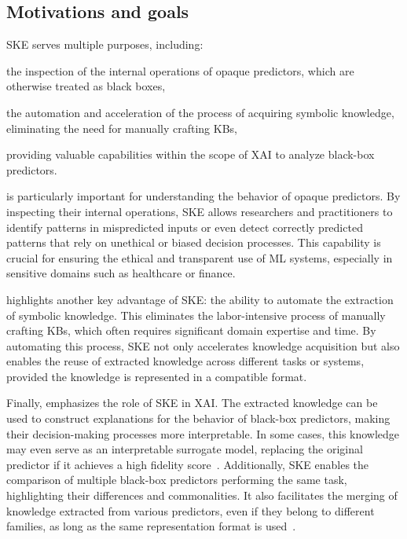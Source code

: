 \subsection{Motivations and goals}\label{subsec:ske-motivations-and-goals}
%
\Gls{SKE} serves multiple purposes, including:
%
\begin{inlinelist}
    \item \label{itm:inspection} the inspection of the internal operations of opaque predictors, which are otherwise treated as black boxes,
    \item \label{itm:automation} the automation and acceleration of the process of acquiring symbolic knowledge, eliminating the need for manually crafting \glspl{KB},
    \item \label{itm:xai} providing valuable capabilities within the scope of \gls{XAI} to analyze black-box predictors.
\end{inlinelist}

 is particularly important for understanding the behavior of opaque predictors.
%
By inspecting their internal operations, \gls{SKE} allows researchers and practitioners to identify patterns in mispredicted inputs or even detect correctly predicted patterns that rely on unethical or biased decision processes.
%
This capability is crucial for ensuring the ethical and transparent use of \gls{ML} systems, especially in sensitive domains such as healthcare or finance.

 highlights another key advantage of \gls{SKE}: the ability to automate the extraction of symbolic knowledge.
%
This eliminates the labor-intensive process of manually crafting \glspl{KB}, which often requires significant domain expertise and time.
%
By automating this process, \gls{SKE} not only accelerates knowledge acquisition but also enables the reuse of extracted knowledge across different tasks or systems, provided the knowledge is represented in a compatible format.

Finally,  emphasizes the role of \gls{SKE} in \gls{XAI}.
%
The extracted knowledge can be used to construct explanations for the behavior of black-box predictors, making their decision-making processes more interpretable.
%
In some cases, this knowledge may even serve as an interpretable surrogate model, replacing the original predictor if it achieves a high fidelity score~\cite{DBLP:conf/atal/CiattoCSO20}.
%
Additionally, \gls{SKE} enables the comparison of multiple black-box predictors performing the same task, highlighting their differences and commonalities.
%
It also facilitates the merging of knowledge extracted from various predictors, even if they belong to different families, as long as the same representation format is used~\cite{DBLP:conf/aiia/CiattoCOC19}.


